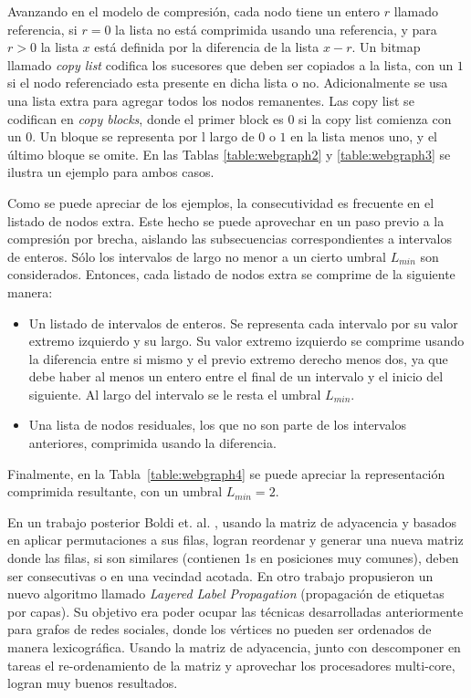 

Avanzando en el modelo de compresión, cada nodo tiene un entero $r$ llamado referencia, si $r = 0$ la lista no está comprimida usando una referencia, y para $r > 0$ la lista $x$ está definida por la diferencia de la lista $x - r$. Un bitmap llamado \textit{copy list} codifica los sucesores que deben ser copiados a la lista, con un $1$ si el nodo referenciado esta presente en dicha lista o no. Adicionalmente se usa una lista extra para agregar todos los nodos remanentes. Las copy list se codifican en \textit{copy blocks}, donde el primer block es $0$ si la copy list comienza con un $0$. Un bloque se representa por l largo de $0$ o $1$ en la lista menos uno, y el último bloque se omite. En las Tablas \ref{table:webgraph2} y \ref{table:webgraph3} se ilustra un ejemplo para ambos casos.





Como se puede apreciar de los ejemplos, la consecutividad es frecuente en el listado de nodos extra. Este hecho se puede aprovechar en un paso previo a la compresión por brecha, aislando las subsecuencias correspondientes a intervalos de enteros. Sólo los intervalos de largo no menor a un cierto umbral $L_{min}$ son considerados. Entonces, cada listado de nodos extra se comprime de la siguiente manera:

\begin{itemize}
	\item Un listado de intervalos de enteros. Se representa cada intervalo por su valor extremo izquierdo y su largo. Su valor extremo izquierdo se comprime usando la diferencia entre si mismo y el previo extremo derecho menos dos, ya que debe haber al menos un entero entre el final de un intervalo y el inicio del siguiente. Al largo del intervalo se le resta el umbral $L_{min}$.
	\item Una lista de nodos residuales, los que no son parte de los intervalos anteriores, comprimida usando la diferencia.
\end{itemize}



Finalmente, en la Tabla~\ref{table:webgraph4} se puede apreciar la representación comprimida resultante, con un umbral $L_{min} = 2$. 

En un trabajo posterior Boldi et. al. \cite{boldi2009permuting}, usando la matriz de adyacencia y basados en aplicar permutaciones a sus filas, logran reordenar y generar una nueva matriz donde las filas, si son similares (contienen 1s en posiciones muy comunes), deben ser consecutivas o en una vecindad acotada. En otro trabajo propusieron un nuevo algoritmo llamado \textit{Layered Label Propagation} \cite{boldi2011layered} (propagación de etiquetas por capas). Su objetivo era poder ocupar las técnicas desarrolladas anteriormente para grafos de redes sociales, donde los vértices no pueden ser ordenados de manera lexicográfica. Usando la matriz de adyacencia, junto con descomponer en tareas el re-ordenamiento de la matriz y aprovechar los procesadores multi-core, logran muy buenos resultados.



